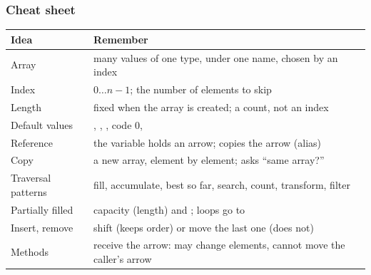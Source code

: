 \documentclass[aspectratio=169,10pt,compress]{beamer}
\begin{document}
\begin{frame}[t,fragile] \frametitle{Cheat sheet}


\begin{table}
		\footnotesize
		\begin{tabular}{@{}L{0.22\textwidth}L{0.70\textwidth}@{}}
			\toprule
			\textbf{Idea} & \textbf{Remember} \\
			\midrule
			Array               & many values of one type, under one name, chosen by an index \\
			Index               & $0 \dots n - 1$; the number of elements to skip \\
			Length              & fixed when the array is created; a count, not an index \\
			Default values      & , , , code 0,  \\
			Reference           & the variable holds an arrow;  copies the arrow (alias) \\
			Copy                & a new array, element by element; \hCode{==} asks ``same array?'' \\
			Traversal patterns  & fill, accumulate, best so far, search, count, transform, filter \\
			Partially filled    & capacity (length) and ; loops go to  \\
			Insert, remove      & shift (keeps order) or move the last one (does not) \\
			Methods             & receive the arrow: may change elements, cannot move the caller's arrow \\
			\bottomrule
		\end{tabular}
\end{table}%
\end{frame}
\end{document}
